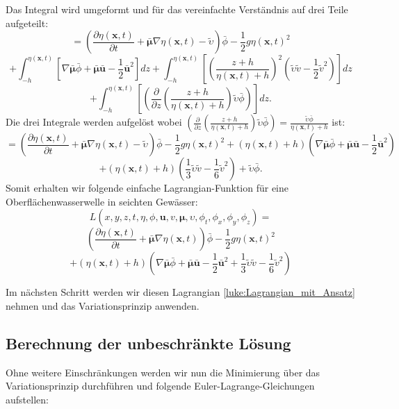 Das Integral wird umgeformt und für das vereinfachte Verständnis auf drei Teile aufgeteilt:
\[
=
\left(\frac{\partial \eta(\bm{x}, t)}{\partial t}
+
\bar{\bm{\mu}}  \nabla \eta(\bm{x}, t)
-
\widetilde{\upsilon}\right) \bar{\phi}
-
\frac{1}{2} g \eta(\bm{x}, t)^2
\]
\[
+
\int_{-h}^{\eta(\bm{x}, t)} \left[ \nabla \bar{\bm{\mu}}\bar{\phi} + \bar{\bm{\mu}}\bar{\bm{u}} - \frac{1}{2} \bar{\bm{u}}^2\right] dz
+
\int_{-h}^{\eta(\bm{x}, t)} \left[ \left(\frac{z + h}{\eta(\bm{x}, t) + h}\right)^2 \left(\tilde{\upsilon}\tilde{v} - \frac{1}{2} \tilde{v}^2\right)\right] dz
\]
\[
+
\int_{-h}^{\eta(\bm{x}, t)} \left[ \left(\frac{\partial}{\partial z} \left(\frac{z + h}{\eta(\bm{x}, t) + h}\right)\tilde{\upsilon} \bar{\phi} \right)\right] dz.
\]
Die drei Integrale werden aufgelöst wobei $\left(\frac{\partial}{\partial z} \left(\frac{z + h}{\eta(\bm{x}, t) + h}\right)\tilde{\upsilon} \bar{\phi} \right) = \frac{\tilde{\upsilon} \bar{\phi}}{\eta(\bm{x}, t) + h}$ ist:
\[
=
\left(\frac{\partial \eta(\bm{x}, t)}{\partial t}
+
\bar{\bm{\mu}} \nabla \eta(\bm{x}, t)
-
\widetilde{\upsilon}\right) \bar{\phi}
-
\frac{1}{2} g \eta(\bm{x}, t)^2
+
(\eta(\bm{x}, t) + h) \left(\nabla \bar{\bm{\mu}}\bar{\phi} + \bar{\bm{\mu}}\bar{\bm{u}} - \frac{1}{2} \bar{\bm{u}}^2\right)
\]
\[
+
(\eta(\bm{x}, t) + h) \left(\frac{1}{3}\tilde{\upsilon}\tilde{v} - \frac{1}{6}\tilde{v}^2 \right)
+
\tilde{\upsilon} \bar{\phi}.
\]
Somit erhalten wir folgende einfache Lagrangian-Funktion für eine Oberflächenwasserwelle in seichten Gewässer:
\[
L(x,y,z,t,\eta,\phi,\bm{u}, v, \bm{\mu},\upsilon,\phi_t,\phi_x,\phi_y,\phi_z)
=
\]
\[
\left(\frac{\partial \eta(\bm{x}, t)}{\partial t}
+
\bar{\bm{\mu}} \nabla \eta(\bm{x}, t) \right) \bar{\phi}
-
\frac{1}{2} g \eta(\bm{x}, t)^2
\]
\begin{equation}
	+
	(\eta(\bm{x}, t) + h) \left(\nabla \bar{\bm{\mu}}\bar{\phi} + \bar{\bm{\mu}}\bar{\bm{u}} - \frac{1}{2} \bar{\bm{u}}^2 + \frac{1}{3} \tilde{\upsilon}\tilde{v} - \frac{1}{6}\tilde{v}^2\right)
	\label{luke:Lagrangian_mit_Ansatz}
\end{equation}

Im nächsten Schritt werden wir diesen Lagrangian \eqref{luke:Lagrangian_mit_Ansatz} nehmen und das Variationsprinzip anwenden.

\subsection{Berechnung der unbeschränkte Lösung}

Ohne weitere Einschränkungen werden wir nun die Minimierung über das Variationsprinzip durchführen und folgende Euler-Lagrange-Gleichungen aufstellen:

